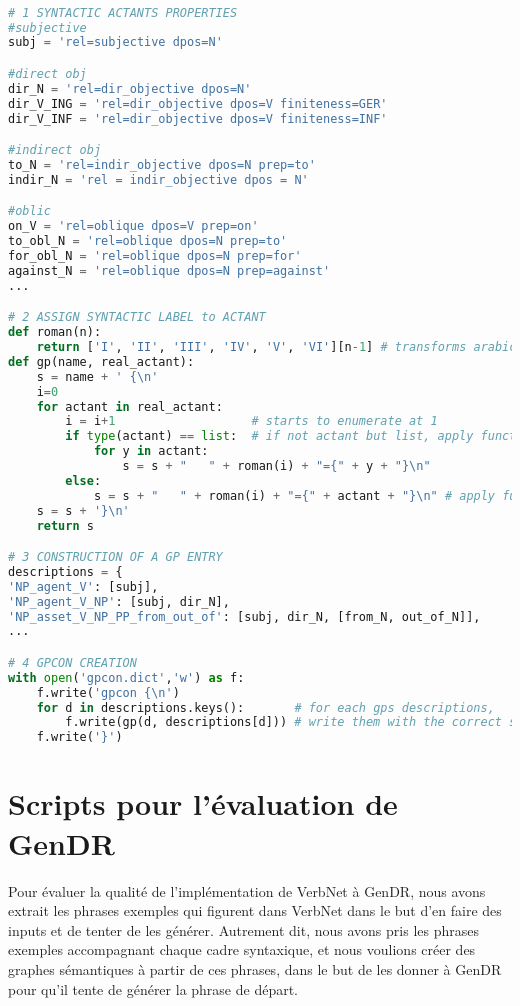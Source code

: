 \begin{lstlisting}[language=Python, caption = code pour gpcon.dict]

# 1 SYNTACTIC ACTANTS PROPERTIES
#subjective
subj = 'rel=subjective dpos=N'

#direct obj
dir_N = 'rel=dir_objective dpos=N'
dir_V_ING = 'rel=dir_objective dpos=V finiteness=GER'
dir_V_INF = 'rel=dir_objective dpos=V finiteness=INF'

#indirect obj
to_N = 'rel=indir_objective dpos=N prep=to'
indir_N = 'rel = indir_objective dpos = N'

#oblic
on_V = 'rel=oblique dpos=V prep=on'
to_obl_N = 'rel=oblique dpos=N prep=to' 
for_obl_N = 'rel=oblique dpos=N prep=for'
against_N = 'rel=oblique dpos=N prep=against'
...

# 2 ASSIGN SYNTACTIC LABEL to ACTANT
def roman(n):
    return ['I', 'II', 'III', 'IV', 'V', 'VI'][n-1] # transforms arabic numbers in roman numbers
def gp(name, real_actant):
    s = name + ' {\n'
    i=0
    for actant in real_actant:
        i = i+1                   # starts to enumerate at 1
        if type(actant) == list:  # if not actant but list, apply function to actants in list
            for y in actant:
                s = s + "   " + roman(i) + "={" + y + "}\n"
        else:
            s = s + "   " + roman(i) + "={" + actant + "}\n" # apply function to actant
    s = s + '}\n'
    return s 

# 3 CONSTRUCTION OF A GP ENTRY
descriptions = {
'NP_agent_V': [subj],
'NP_agent_V_NP': [subj, dir_N],
'NP_asset_V_NP_PP_from_out_of': [subj, dir_N, [from_N, out_of_N]],
...

# 4 GPCON CREATION
with open('gpcon.dict','w') as f: 
    f.write('gpcon {\n')
    for d in descriptions.keys():       # for each gps descriptions,
        f.write(gp(d, descriptions[d])) # write them with the correct syntactic label
    f.write('}')
\end{lstlisting}

\section{Scripts pour l'évaluation de GenDR}

Pour évaluer la qualité de l'implémentation de VerbNet à GenDR, nous avons extrait les phrases exemples qui figurent dans VerbNet dans le but d'en faire des inputs et de tenter de les générer. Autrement dit, nous avons pris les phrases exemples accompagnant chaque cadre syntaxique, et nous voulions créer des graphes sémantiques à partir de ces phrases, dans le but de les donner à GenDR pour qu'il tente de générer la phrase de départ.

